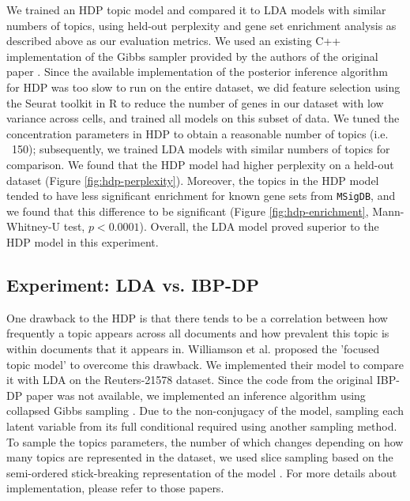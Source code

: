 \documentclass{article}
\begin{document}
We trained an HDP topic model and compared it to LDA models with similar numbers of topics, using held-out perplexity and gene set enrichment analysis as described above as our evaluation metrics. We used an existing C++ implementation of the Gibbs sampler provided by the authors of the original paper \cite{HDP}. Since the available implementation of the posterior inference algorithm for HDP was too slow to run on the entire dataset, we did feature selection using the Seurat toolkit in R \cite{seurat} to reduce the number of genes in our dataset with low variance across cells, and trained all models on this subset of data. We tuned the concentration parameters in HDP to obtain a reasonable number of topics (i.e. ~150); subsequently, we trained LDA models with similar numbers of topics for comparison. We found that the HDP model had higher perplexity on a held-out dataset (Figure \ref{fig:hdp-perplexity}). Moreover, the topics in the HDP model tended to have less significant enrichment for known gene sets from \texttt{MSigDB}, and we found that this difference to be significant (Figure \ref{fig:hdp-enrichment}, Mann-Whitney-U test, $p<0.0001$). Overall, the LDA model proved superior to the HDP model in this experiment.

\subsection{Experiment: LDA vs. IBP-DP}
One drawback to the HDP is that there tends to be a correlation between how frequently a topic appears across all documents and how prevalent this topic is within documents that it appears in. Williamson et al. \cite{IBP} proposed the 'focused topic model' to overcome this drawback. We implemented their model to compare it with LDA on the Reuters-21578 dataset. Since the code from the original IBP-DP paper was not available, we implemented an inference algorithm using collapsed Gibbs sampling \cite{IBP}. Due to the non-conjugacy of the model, sampling each latent variable from its full conditional required using another sampling method. To sample the topics parameters, the number of which changes depending on how many topics are represented in the dataset, we used slice sampling based on the semi-ordered stick-breaking representation of the model \cite{IBP2}. For more details about implementation, please refer to those papers.\\
\end{document}
